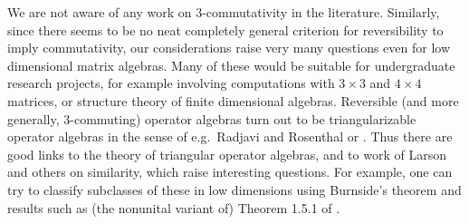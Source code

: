 \documentclass{amsart}
\theoremstyle{remark}
\theoremstyle{definition}
\numberwithin{equation}{section}
\begin{document}
We are not aware of any work on 3-commutativity in the literature.    Similarly, since there seems to be no neat completely general criterion for reversibility to imply commutativity, 
our considerations raise 
very many questions even for low dimensional matrix algebras.   Many of these would be suitable for undergraduate research projects, for example involving computations with  $3 \times 3$ and $4 \times 4$ matrices, or structure theory of finite dimensional algebras.   Reversible (and more generally, 3-commuting) operator algebras turn out to be   triangularizable operator algebras in the sense of  e.g.\ Radjavi and Rosenthal \cite{RR} or \cite{KS}.
Thus there are good links to the theory of triangular operator algebras, and to work of Larson \cite{L} and others on similarity, which raise interesting questions.  For example,  one can try to classify subclasses of these in low dimensions using Burnside's theorem and results such as (the nonunital variant of) Theorem 1.5.1 of \cite{RR}.  
\end{document}
